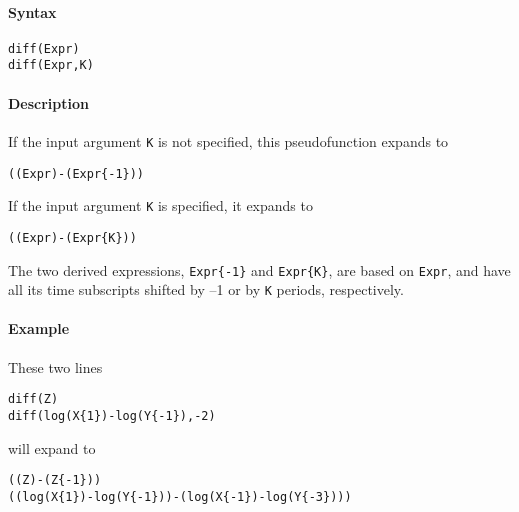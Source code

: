 


	\paragraph{Syntax}

\begin{verbatim}
diff(Expr)
diff(Expr,K)
\end{verbatim}

\paragraph{Description}

If the input argument \texttt{K} is not specified, this pseudofunction
expands to

\begin{verbatim}
((Expr)-(Expr{-1}))
\end{verbatim}

If the input argument \texttt{K} is specified, it expands to

\begin{verbatim}
((Expr)-(Expr{K}))
\end{verbatim}

The two derived expressions, \texttt{Expr\{-1\}} and \texttt{Expr\{K\}},
are based on \texttt{Expr}, and have all its time subscripts shifted by
--1 or by \texttt{K} periods, respectively.

\paragraph{Example}

These two lines

\begin{verbatim}
diff(Z)
diff(log(X{1})-log(Y{-1}),-2)
\end{verbatim}

will expand to

\begin{verbatim}
((Z)-(Z{-1}))
((log(X{1})-log(Y{-1}))-(log(X{-1})-log(Y{-3})))
\end{verbatim}


